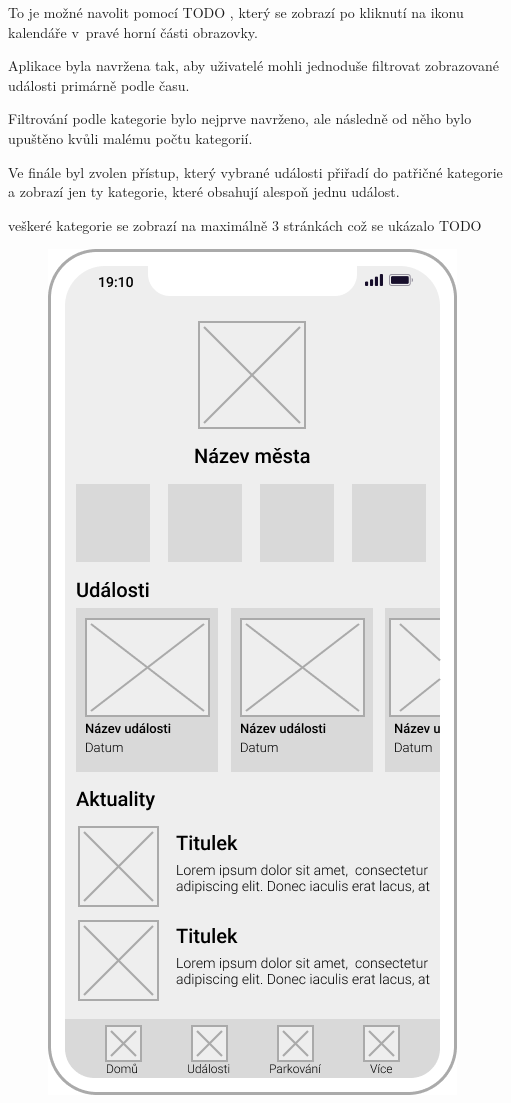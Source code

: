 \begin{minipage}[t]{0.45\textwidth}
  To je možné navolit pomocí TODO , který se zobrazí po kliknutí na ikonu kalendáře v~pravé horní části obrazovky.
  
  
  
  Aplikace byla navržena tak, aby uživatelé mohli jednoduše filtrovat zobrazované události primárně podle času.
  
  Filtrování podle kategorie bylo nejprve navrženo, ale následně od něho bylo upuštěno kvůli malému počtu kategorií.
  
  Ve finále byl zvolen přístup, který vybrané události přiřadí do patřičné kategorie a zobrazí jen ty kategorie, které obsahují alespoň jednu událost.
  
  veškeré kategorie se zobrazí na maximálně 3 stránkách což se ukázalo TODO
\end{minipage}
\hfill
\begin{minipage}[t]{0.45\textwidth}
  \begin{figure}[H]
    \centering
    \includegraphics[width=.7\textwidth]{home_wireframe.png}

\end{figure}
\end{minipage}
